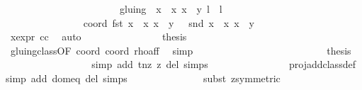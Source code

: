 \begin{isabellebody}
\ \ \ \ \ \ \ \ \ \ \ \ \ \ \ \ \ \ \ \ \ \ {\isacharequal}\ gluing\ {\isacharbackquote}{\isacharbackquote}\ {\isacharbraceleft}{\isacharparenleft}{\isacharparenleft}x\ {\isacharasterisk}\ x{\isacharprime}{\isacharcomma}\ x\ {\isacharasterisk}\ y{\isacharprime}{\isacharparenright}{\isacharcomma}\ l\ {\isacharplus}\ l{\isacharprime}{\isacharparenright}{\isacharbraceright}{\isachardoublequoteclose}\isanewline
\ \ \ \ \ \ \ \ \ \ \ \ \isamarkupfalse%
\ {\isacharminus}\isanewline
\ \ \ \ \ \ \ \ \ \ \ \ \ \ \isamarkupfalse%
\ coord{\isacharcolon}\ {\isachardoublequoteopen}fst\ {\isacharparenleft}{\isacharparenleft}x\ {\isacharasterisk}\ x{\isacharprime}{\isacharcomma}\ x\ {\isacharasterisk}\ y{\isacharprime}{\isacharparenright}{\isacharparenright}\ {\isasymnoteq}\ {}{\isachardoublequoteclose}\ {\isachardoublequoteopen}snd\ {\isacharparenleft}{\isacharparenleft}x\ {\isacharasterisk}\ x{\isacharprime}{\isacharcomma}\ x\ {\isacharasterisk}\ y{\isacharprime}{\isacharparenright}{\isacharparenright}\ {\isasymnoteq}\ {}{\isachardoublequoteclose}\ \isanewline
\ \ \ \ \ \ \ \ \ \ \ \ \ \ \ \ \isamarkupfalse%
\ x{\isacharunderscore}expr\ cc\ \isamarkupfalse%
\ auto\isanewline
\ \ \ \ \ \ \ \ \ \ \ \ \ \ \isamarkupfalse%
\ {\isacharquery}thesis\isanewline
\ \ \ \ \ \ \ \ \ \ \ \ \ \ \ \ \isamarkupfalse%
\ gluing{\isacharunderscore}class{\isacharbrackleft}OF\ coord{\isacharparenleft}{}{\isacharparenright}\ coord{\isacharparenleft}{}{\isacharparenright}{\isacharbrackright}\ rho{\isacharunderscore}aff\ \isamarkupfalse%
\ simp\isanewline
\ \ \ \ \ \ \ \ \ \ \ \ \isamarkupfalse%
\isanewline
\ \ \ \ \ \ \ \ \ \ \ \ \isamarkupfalse%
\ {\isacharquery}thesis\isanewline
\ \ \ \ \ \ \ \ \ \ \ \ \ \ \isamarkupfalse%
\ {}\ \isamarkupfalse%
{\isacharparenleft}simp\ add{\isacharcolon}\ t{\isacharunderscore}nz\ z{}\ del{\isacharcolon}\ {\isasymtau}{\isachardot}simps{\isacharparenright}\isanewline
\ \ \ \ \ \ \ \ \ \ \ \ \ \ \isamarkupfalse%
\ proj{\isacharunderscore}add{\isacharunderscore}class{\isacharunderscore}def\ \isamarkupfalse%
{\isacharparenleft}simp\ add{\isacharcolon}\ dom{\isacharunderscore}eq\ del{\isacharcolon}\ {\isasymtau}{\isachardot}simps{\isacharparenright}\isanewline
\ \ \ \ \ \ \ \ \ \ \ \ \ \ \isamarkupfalse%
{\isacharparenleft}subst\ z{}{\isacharbrackleft}symmetric{\isacharbrackright}{\isacharparenright}{\isacharplus}\isanewline

\end{isabellebody}
